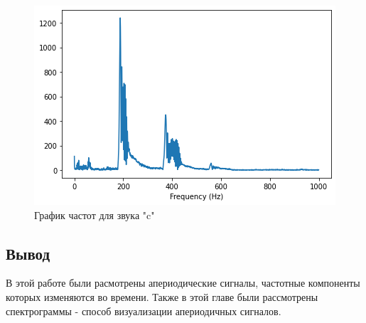 \begin{figure}[H]
	\begin{center}
		\includegraphics[scale=1]{fig/lab03/lab03_16.png}
		\caption{График частот для звука "c"}
	\end{center}
\end{figure}

\subsection{Вывод}

В этой работе были расмотрены апериодические сигналы, частотные компоненты которых изменяются во времени. Также в этой главе были рассмотрены спектрограммы - способ визуализации апериодичных сигналов.
